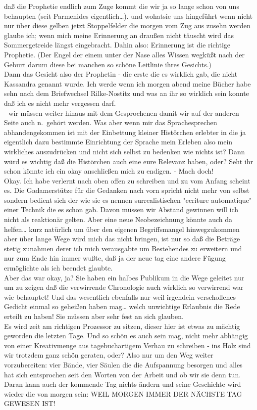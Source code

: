 \documentclass[
]{article}
\begin{document}
daß die Prophetie endlich zum Zuge kommt die wir ja so lange schon von
uns behaupten (seit Parmenides eigentlich\ldots). und wohatsie uns
hingeführt wenn nicht nur über diese gelben jetzt Stoppelfelder die
morgen vom Zug aus zusehn werden glaube ich; wenn mich meine Erinnerung
an draußen nicht täuscht wird das Sommergetreide längst eingebracht.
Dahin also: Erinnerung ist die richtige Prophetie. (Der Engel der einem
unter der Nase alles Wissen wegküßt nach der Geburt darum diese bei
manchen so schöne Leitlinie ihres Gesichts.)\\
Dann das Gesicht also der Prophetin - die erste die es wirklich gab, die
nicht Kassandra genannt wurde. Ich werde wenn ich morgen abend meine
Bücher habe sehn nach dem Briefwechsel Rilke-Nostitz und was an ihr so
wirklich sein konnte daß ich es nicht mehr vergessen darf.\\
- wir müssen weiter hinaus mit dem Gesprochenen damit wir auf der
anderen Seite auch n.~gehört werden. Was aber wenn mir das
Sprachesprechen abhandengekommen ist mit der Einbettung kleiner
Histörchen erlebter in die ja eigentlich dazu bestimmte Einrichtung der
Sprache mein Erleben also mein wirkliches auszudrücken und nicht sich
selbst zu bedenken wie nichts ist? Dann würd es wichtig daß die
Histörchen auch eine eure Relevanz haben, oder? Seht ihr schon könnte
ich ein okay anschließen mich zu endigen. - Mach doch!\\
Okay. Ich habe verlernt nach oben offen zu schreiben und zu vom Anfang
scheint es. Die Gadamerstütze für die Gedanken nach vorn spricht nicht
mehr von selbst sondern bedient sich der wie sie es nennen
surrealistischen "ecriture automatique" einer Technik die es schon gab.
Davon müssen wir Abstand gewinnen will ich nicht als reaktionär gelten.
Aber eine neue Neobezeichnung könnte auch da helfen\ldots{} kurz
natürlich um über den eigenen Begriffsmangel hinwegzukommen aber über
lange Wege wird mich das nicht bringen, ist nur so daß die Beträge
stetig zunahmen derer ich mich verausgabte um Bestehendes zu erweitern
und nur zum Ende hin immer wußte, daß ja der neue tag eine andere Fügung
ermöglichte als ich beendet glaubte.\\
Aber das war okay, ja? Sie haben ein halbes Publikum in die Wege
geleitet nur um zu zeigen daß die verwirrende Chronologie auch wirklich
so verwirrend war wie behauptet! Und das wesentlich ebenfalls nur weil
irgendein verschollenes Gedicht einmal so geheißen haben mag\ldots{}
welch unwichtige Erlaubnis die Rede erteilt zu haben! Sie müssen aber
sehr fest an sich glauben.\\
Es wird zeit am richtigen Prozessor zu sitzen, dieser hier ist etwas zu
mächtig geworden die letzten Tage. Und so schön es auch sein mag, nicht
mehr abhängig von einer Kreativmenge aus tagebuchartigem Verhau zu
schreiben - ins Holz sind wir trotzdem ganz schön geraten, oder? Also
nur um den Weg weiter vorzubereiten: vier Bände, vier Säulen die die
Aufspannung besorgen und alles hat sich entsprochen seit den Worten von
der Arbeit und ob wir sie denn tun. Daran kann auch der kommende Tag
nichts ändern und seine Geschichte wird wieder die von morgen sein: WEIL
MORGEN IMMER DER NÄCHSTE TAG GEWESEN IST!
\end{document}
